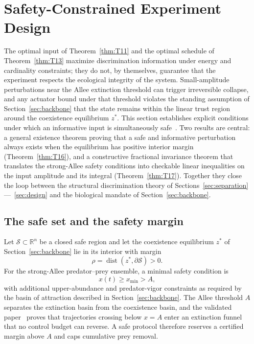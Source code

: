 \section{Safety-Constrained Experiment Design}
\label{sec:safety}

The optimal input of Theorem~\ref{thm:T11} and the optimal schedule of Theorem~\ref{thm:T13} maximize discrimination information under energy and cardinality constraints; they do not, by themselves, guarantee that the experiment respects the ecological integrity of the system. Small-amplitude perturbations near the Allee extinction threshold can trigger irreversible collapse, and any actuator bound under that threshold violates the standing assumption of Section~\ref{sec:backbone} that the state remains within the linear trust region around the coexistence equilibrium \(z^*\). This section establishes explicit conditions under which an informative input is simultaneously safe~\cite{F03,F04,F11,E03,E04,E05,P01}. Two results are central: a general existence theorem proving that a safe and informative perturbation always exists when the equilibrium has positive interior margin (Theorem~\ref{thm:T16}), and a constructive fractional invariance theorem that translates the strong-Allee safety conditions into checkable linear inequalities on the input amplitude and its integral (Theorem~\ref{thm:T17}). Together they close the loop between the structural discrimination theory of Sections~\ref{sec:separation}---\ \ref{sec:design} and the biological mandate of Section~\ref{sec:backbone}.

\subsection{The safe set and the safety margin}

Let \(\mathcal{S} \subset \mathbb{R}^n\) be a closed safe region and let the coexistence equilibrium \(z^*\) of Section~\ref{sec:backbone} lie in its interior with margin
\begin{equation}
\rho = \operatorname{dist}(z^*, \partial \mathcal{S}) > 0.
\label{eq:rho_margin}
\end{equation}
For the strong-Allee predator--prey ensemble, a minimal safety condition is
\begin{equation}
x(t) \ge x_{\min} > A,
\label{eq:min_prey}
\end{equation}
with additional upper-abundance and predator-vigor constraints as required by the basin of attraction described in Section~\ref{sec:backbone}. The Allee threshold \(A\) separates the extinction basin from the coexistence basin, and the validated paper~\cite{P01} proves that trajectories crossing below \(x=A\) enter an extinction funnel that no control budget can reverse. A safe protocol therefore reserves a certified margin above \(A\) and caps cumulative prey removal.

